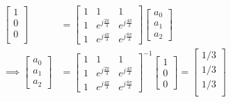 \documentclass{article}
\begin{document}
\begin{align}
    \begin{bmatrix}
        1 \\
        0 \\
        0 \\
    \end{bmatrix}
    &=
    \begin{bmatrix}
        1 & 1 & 1 \\
        1 & e^{j \frac{2\pi}{3}} & e^{j \frac{4\pi}{3}} \\
        1 & e^{j \frac{4\pi}{3}} & e^{j \frac{8\pi}{3}}
    \end{bmatrix}
    \begin{bmatrix}
        a_0 \\
        a_1 \\
        a_2
    \end{bmatrix} \\
    \implies \begin{bmatrix}
        a_0 \\
        a_1 \\
        a_2
    \end{bmatrix}
    &= 
    \begin{bmatrix}
        1 & 1 & 1 \\
        1 & e^{j \frac{2\pi}{3}} & e^{j \frac{4\pi}{3}} \\
        1 & e^{j \frac{4\pi}{3}} & e^{j \frac{8\pi}{3}}
    \end{bmatrix}^{-1}
    \begin{bmatrix}
        1 \\
        0 \\
        0
    \end{bmatrix}
    =
    \begin{bmatrix}
        1 / 3 \\
        1 / 3 \\
        1 / 3 \\
    \end{bmatrix}
\end{align}

\subsection{}
\end{document}
